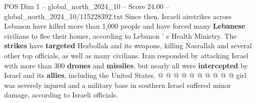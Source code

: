\begin{textsample}{POS Dim 1 – global\_north\_2024\_10 – Score 24.00 – global\_north\_2024\_10/115228392.txt}
Since then, Israeli airstrikes across Lebanon have killed more than 1,000 people and have forced many \textbf{Lebanese} civilians to flee their homes, according to Lebanon ' s Health Ministry.
The \textbf{strikes} have \textbf{targeted} Hezbollah and its weapons, killing Nasrallah and several other top officials, as well as many civilians.
Iran responded by attacking Israel with more than 300 \textbf{drones} and \textbf{missiles}, but nearly all were \textbf{intercepted} by Israel and its \textbf{allies}, including the United States. @ @ @ @ @ @ @ @ @ @ girl was severely injured and a military base in southern Israel suffered minor damage, according to Israeli officials.

\end{textsample}

